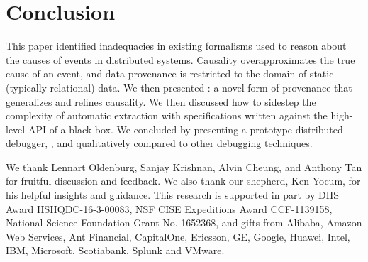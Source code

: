 \section{Conclusion}
This paper identified inadequacies in existing formalisms used to reason about
the causes of events in distributed systems. Causality overapproximates the
true cause of an event, and data provenance is restricted to the domain of
static (typically relational) data. We then presented \watprovenance{}: a novel
form of provenance that generalizes \whyprovenance{} and refines causality. We
then discussed how to sidestep the complexity of automatic \watprovenance{}
extraction with \watprovenance{} specifications written against the high-level
API of a black box. We concluded by presenting a prototype distributed
debugger, \fluent{}, and qualitatively compared \fluent{} to other debugging
techniques.

\begin{acks}
  We thank Lennart Oldenburg, Sanjay Krishnan, Alvin Cheung, and Anthony Tan
  for fruitful discussion and feedback. We also thank our shepherd, Ken Yocum,
  for his helpful insights and guidance.
  This research is supported in part by DHS Award HSHQDC-16-3-00083, NSF CISE
  Expeditions Award CCF-1139158, National Science Foundation Grant No. 1652368,
  and gifts from Alibaba, Amazon Web Services, Ant Financial, CapitalOne,
  Ericsson, GE, Google, Huawei, Intel, IBM, Microsoft, Scotiabank, Splunk and
  VMware.
\end{acks}

